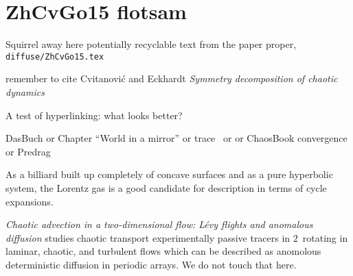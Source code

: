 
\section{ZhCvGo15 flotsam}
\label{s:flotsam}

Squirrel away here potentially recyclable text from the
paper proper, \texttt{diffuse/ZhCvGo15.tex}

remember to cite Cvitanovi\'c and Eckhardt {\em Symmetry
decomposition of chaotic dynamics}

A test of hyperlinking: what looks better?

DasBuch
or
 {Chapter ``{World} in a mirror''}
or trace~
or 
or ChaosBook convergence
or Predrag

As a billiard built up completely of concave surfaces and as a pure
hyperbolic system, the Lorentz gas is a good candidate for description in
terms of cycle expansions.

                                                            \toCB
{} {\em Chaotic advection in a two-dimensional
flow: L\'evy flights and anomalous diffusion} studies chaotic transport
experimentally passive tracers in $2$\dmn\ rotating in laminar, chaotic,
and turbulent flows which can be described as anomolous deterministic
diffusion in periodic arrays. We do not touch that here.
